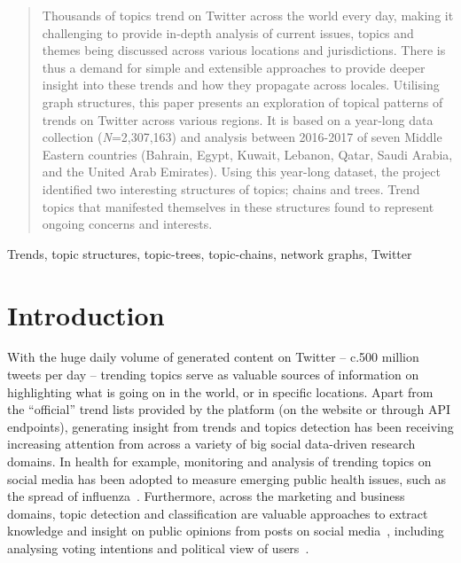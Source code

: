 \documentclass[conference]{IEEEtran}
\begin{document}
\begin{abstract}
Thousands of topics trend on Twitter across the world every day,
making it challenging to provide in-depth analysis of current issues,
topics and themes being discussed across various locations and
jurisdictions. There is thus a demand for simple and extensible
approaches to provide deeper insight into these trends and how they
propagate across locales. Utilising graph structures, this paper
presents an exploration of topical patterns of trends on Twitter
across various regions. It is based on a year-long data collection
({\emph{N}}=2,307,163) and analysis between 2016-2017 of seven Middle
Eastern countries (Bahrain, Egypt, Kuwait, Lebanon, Qatar, Saudi
Arabia, and the United Arab Emirates). Using this year-long dataset,
the project identified two interesting structures of topics; chains
and trees. Trend topics that manifested themselves in these structures
found to represent ongoing concerns and interests.
\end{abstract}

\begin{IEEEkeywords}
Trends, topic structures, topic-trees, topic-chains, network graphs, Twitter
\end{IEEEkeywords}

\section{Introduction}\label{intro}

With the huge daily volume of generated content on Twitter -- c.500
million tweets per day -- trending topics serve as valuable sources of
information on highlighting what is going on in the world, or in
specific locations. Apart from the ``official'' trend lists provided
by the platform (on the website or through API endpoints), generating
insight from trends and topics detection has been receiving increasing
attention from across a variety of big social data-driven research
domains. In health for example, monitoring and analysis of trending
topics on social media has been adopted to measure emerging public
health issues, such as the spread of
influenza~\cite{Achrekar2011,Parker2013,Parker2015}. Furthermore,
across the marketing and business domains, topic detection and
classification are valuable approaches to extract knowledge and
insight on public opinions from posts on social
media~\cite{blamey-et-al-2012,Bello2013,albishry-et-al:ssei2018},
including analysing voting intentions and political view of
users~\cite{Fang2015}.
\end{document}
